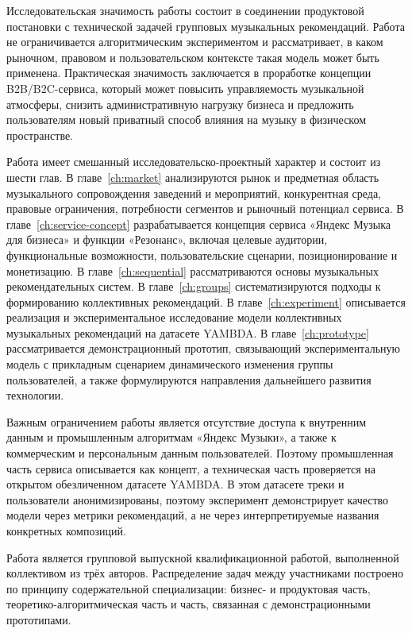 Исследовательская значимость работы состоит в соединении продуктовой постановки с технической задачей групповых музыкальных рекомендаций. Работа не ограничивается алгоритмическим экспериментом и рассматривает, в каком рыночном, правовом и пользовательском контексте такая модель может быть применена. Практическая значимость заключается в проработке концепции B2B/B2C-сервиса, который может повысить управляемость музыкальной атмосферы, снизить административную нагрузку бизнеса и предложить пользователям новый приватный способ влияния на музыку в физическом пространстве.

Работа имеет смешанный исследовательско-проектный характер и состоит из шести глав. В главе~\ref{ch:market} анализируются рынок и предметная область музыкального сопровождения заведений и мероприятий, конкурентная среда, правовые ограничения, потребности сегментов и рыночный потенциал сервиса. В главе~\ref{ch:service-concept} разрабатывается концепция сервиса «Яндекс Музыка для бизнеса» и функции «Резонанс», включая целевые аудитории, функциональные возможности, пользовательские сценарии, позиционирование и монетизацию. В главе~\ref{ch:sequential} рассматриваются основы музыкальных рекомендательных систем. В главе~\ref{ch:groups} систематизируются подходы к формированию коллективных рекомендаций. В главе~\ref{ch:experiment} описывается реализация и экспериментальное исследование модели коллективных музыкальных рекомендаций на датасете YAMBDA. В главе~\ref{ch:prototype} рассматривается демонстрационный прототип, связывающий экспериментальную модель с прикладным сценарием динамического изменения группы пользователей, а также формулируются направления дальнейшего развития технологии.

Важным ограничением работы является отсутствие доступа к внутренним данным и промышленным алгоритмам «Яндекс Музыки», а также к коммерческим и персональным данным пользователей. Поэтому промышленная часть сервиса описывается как концепт, а техническая часть проверяется на открытом обезличенном датасете YAMBDA. В этом датасете треки и пользователи анонимизированы, поэтому эксперимент демонстрирует качество модели через метрики рекомендаций, а не через интерпретируемые названия конкретных композиций.

Работа является групповой выпускной квалификационной работой, выполненной коллективом из трёх авторов. Распределение задач между участниками построено по принципу содержательной специализации: бизнес- и продуктовая часть, теоретико-алгоритмическая часть и часть, связанная с демонстрационными прототипами.

